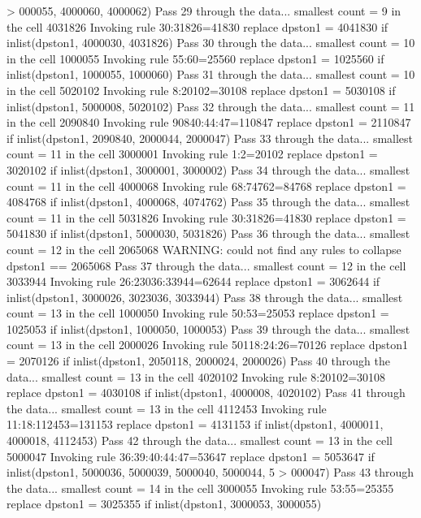 > 000055, 4000060, 4000062)
Pass 29 through the data...
  smallest count = 9 in the cell      4031826
  Invoking rule 30:31826=41830
  replace dpston1 = 4041830 if inlist(dpston1, 4000030, 4031826)
Pass 30 through the data...
  smallest count = 10 in the cell      1000055
  Invoking rule 55:60=25560
  replace dpston1 = 1025560 if inlist(dpston1, 1000055, 1000060)
Pass 31 through the data...
  smallest count = 10 in the cell      5020102
  Invoking rule 8:20102=30108
  replace dpston1 = 5030108 if inlist(dpston1, 5000008, 5020102)
Pass 32 through the data...
  smallest count = 11 in the cell      2090840
  Invoking rule 90840:44:47=110847
  replace dpston1 = 2110847 if inlist(dpston1, 2090840, 2000044, 2000047)
Pass 33 through the data...
  smallest count = 11 in the cell      3000001
  Invoking rule 1:2=20102
  replace dpston1 = 3020102 if inlist(dpston1, 3000001, 3000002)
Pass 34 through the data...
  smallest count = 11 in the cell      4000068
  Invoking rule 68:74762=84768
  replace dpston1 = 4084768 if inlist(dpston1, 4000068, 4074762)
Pass 35 through the data...
  smallest count = 11 in the cell      5031826
  Invoking rule 30:31826=41830
  replace dpston1 = 5041830 if inlist(dpston1, 5000030, 5031826)
Pass 36 through the data...
  smallest count = 12 in the cell      2065068
  WARNING: could not find any rules to collapse dpston1 == 2065068
Pass 37 through the data...
  smallest count = 12 in the cell      3033944
  Invoking rule 26:23036:33944=62644
  replace dpston1 = 3062644 if inlist(dpston1, 3000026, 3023036, 3033944)
Pass 38 through the data...
  smallest count = 13 in the cell      1000050
  Invoking rule 50:53=25053
  replace dpston1 = 1025053 if inlist(dpston1, 1000050, 1000053)
Pass 39 through the data...
  smallest count = 13 in the cell      2000026
  Invoking rule 50118:24:26=70126
  replace dpston1 = 2070126 if inlist(dpston1, 2050118, 2000024, 2000026)
Pass 40 through the data...
  smallest count = 13 in the cell      4020102
  Invoking rule 8:20102=30108
  replace dpston1 = 4030108 if inlist(dpston1, 4000008, 4020102)
Pass 41 through the data...
  smallest count = 13 in the cell      4112453
  Invoking rule 11:18:112453=131153
  replace dpston1 = 4131153 if inlist(dpston1, 4000011, 4000018, 4112453)
Pass 42 through the data...
  smallest count = 13 in the cell      5000047
  Invoking rule 36:39:40:44:47=53647
  replace dpston1 = 5053647 if inlist(dpston1, 5000036, 5000039, 5000040, 5000044, 5
> 000047)
Pass 43 through the data...
  smallest count = 14 in the cell      3000055
  Invoking rule 53:55=25355
  replace dpston1 = 3025355 if inlist(dpston1, 3000053, 3000055)
